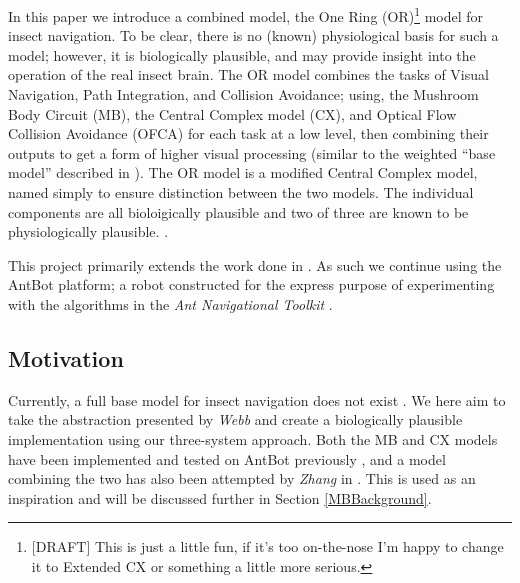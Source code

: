 \documentclass[a4paper,11pt,twoside,openright]{article}
\begin{document}
In this paper we introduce a combined model, the One Ring (OR)\footnote{[DRAFT]
  This is just a little fun, if it's too on-the-nose I'm happy to change it to
  Extended CX or something a little more serious.
} model for insect
navigation. To be clear, there is no (known) physiological basis for such a
model; however, it is biologically plausible, and may provide insight into
the operation of the real insect brain. The OR model combines the tasks of Visual
Navigation, Path Integration, and Collision Avoidance; using, the Mushroom Body
Circuit (MB)\cite{Ardin2016}, the Central Complex model (CX)\cite{Stone2017},
and Optical Flow Collision Avoidance (OFCA)\cite{Mitchell2018} for each task
at a low level, then combining their outputs to get a form of higher visual
processing (similar to the weighted ``base model'' described in \cite{Webb2018}).
The OR model is a modified Central Complex model, named simply to ensure
distinction between the two models. The individual components are all
bioloigically plausible and two of three are known to be physiologically
plausible. \cite{Ardin2016, Stone2017, Mitchell2018}.
\newline
\par

This project primarily extends the work done in \cite{Mitchell2018}. As such we
continue using the AntBot platform; a robot constructed for the express purpose
of experimenting with the algorithms in the \textit{Ant Navigational Toolkit}
\cite{Wehner2009}.

\subsection{ Motivation }
Currently, a full base model for insect navigation does not exist
\cite{Webb2018}. We here aim to take the abstraction presented by \textit{Webb}
and create a biologically plausible implementation using our three-system
approach. Both the MB and CX models have been implemented and tested on AntBot
previously \cite{Scimeca2017, Mitchell2018, Eberding2016, Zhang2017}, and a model
combining the two has also been attempted by \textit{Zhang} in \cite{Zhang2017}.
This is used as an inspiration and will be discussed further in Section
\ref{MBBackground}.
\newline
\par
\end{document}
